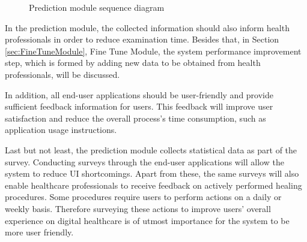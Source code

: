 \begin{figure}[htbp]
\centering
{}
\caption{Prediction module sequence diagram}
\label{fig:PredictionModuleSequenceDiagram}
\end{figure}

In the prediction module, the collected information should also inform health professionals in order to reduce examination time. Besides that, in Section \ref{sec:FineTuneModule}, Fine Tune Module, the system performance improvement step, which is formed by adding new data to be obtained from health professionals, will be discussed.

In addition, all end-user applications should be user-friendly and provide sufficient feedback information for users. This feedback will improve user satisfaction and reduce the overall process's time consumption, such as application usage instructions.

Last but not least, the prediction module collects statistical data as part of the survey. Conducting surveys through the end-user applications will allow the system to reduce UI shortcomings. Apart from these, the same surveys will also enable healthcare professionals to receive feedback on actively performed healing procedures. Some procedures require users to perform actions on a daily or weekly basis. Therefore surveying these actions to improve users' overall experience on digital healthcare is of utmost importance for the system to be more user friendly.

